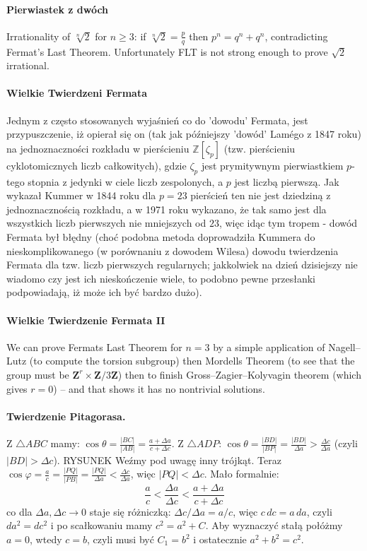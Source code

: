 \begin{parnumbers}
\paragraph{Pierwiastek z dwóch} Irrationality of $\sqrt[n]{2}$ for $n \geq 3$: if $\sqrt[n]{2} = \frac{p}{q}$ then $p^n=q^n + q^n$, contradicting Fermat's Last Theorem. Unfortunately FLT is not strong enough to prove $\sqrt{2}$ irrational.



\paragraph{Wielkie Twierdzeni Fermata} Jednym z często stosowanych wyjaśnień co do 'dowodu' Fermata, jest przypuszczenie, iż opierał się on (tak jak późniejszy 'dowód' Lamégo z 1847 roku) na jednoznaczności rozkładu w pierścieniu $\mathbb{Z}[\zeta_{p}]$ (tzw. pierścieniu cyklotomicznych liczb całkowitych), gdzie $\zeta_{p}$ jest prymitywnym pierwiastkiem $p$-tego stopnia z jedynki w ciele liczb zespolonych, a $p$ jest liczbą pierwszą. Jak wykazał Kummer w 1844 roku dla $p=23$ pierścień ten nie jest dziedziną z jednoznacznością rozkładu, a w 1971 roku wykazano, że tak samo jest dla wszystkich liczb pierwszych nie mniejszych od $23$, więc idąc tym tropem - dowód Fermata był błędny (choć podobna metoda doprowadziła Kummera do nieskomplikowanego (w porównaniu z dowodem Wilesa) dowodu twierdzenia Fermata dla tzw. liczb pierwszych regularnych; jakkolwiek na dzień dzisiejszy nie wiadomo czy jest ich nieskończenie wiele, to podobno pewne przesłanki podpowiadają, iż może ich być bardzo dużo).

\paragraph{Wielkie Twierdzenie Fermata II} We can prove Fermats Last Theorem for $n=3$ by a simple application of Nagell--Lutz (to compute the torsion subgroup) then Mordells Theorem (to see that the group must be $\mathbf{Z}^r \times \mathbf{Z}/3\mathbf{Z}$) then to finish Gross--Zagier--Kolyvagin theorem (which gives $r=0$) -- and that shows it has no nontrivial solutions.



\paragraph{Twierdzenie Pitagorasa.} Z $\triangle ABC$ mamy: $\cos \theta = \frac{|BC|}{|AB|} = \frac{a+\Delta a}{c+\Delta c}$. Z $\triangle ADP$: $\cos \theta = \frac{|BD|}{|BP|} = \frac{|BD|}{\Delta a} > \frac{\Delta c}{\Delta a}$ (czyli $|BD| > \Delta c$). RYSUNEK Weźmy pod uwagę inny trójkąt. Teraz $\cos \varphi = \frac{a}{c} = \frac{|PQ|}{|PB|} = \frac{|PQ|}{\Delta a} < \frac{\Delta c}{\Delta a}$, więc $|PQ| < \Delta c$. Mało formalnie: $$\frac{a}{c} < \frac{\Delta a}{\Delta c} < \frac{a+\Delta a}{c+\Delta c}$$ co dla $\Delta a, \Delta c \rightarrow 0$ staje się różniczką: $\Delta c/\Delta a = a / c$, więc $c\, dc = a\, da$, czyli $da^2=dc^2$ i po scałkowaniu mamy $c^2=a^2+C$. Aby wyznaczyć stałą połóżmy $a = 0$, wtedy $c = b$, czyli musi być $C_1=b^2$ i ostatecznie $a^2+b^2=c^2$.


\end{parnumbers}
